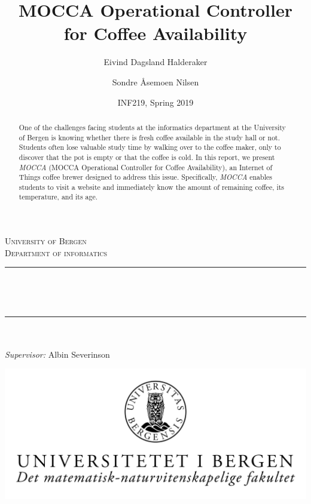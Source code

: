 \documentclass[12pt,a4paper,oneside,article]{memoir}
\title{MOCCA Operational Controller for Coffee Availability}
\author{Eivind Dagsland Halderaker \and Sondre Åsemoen Nilsen}
\date{INF219, Spring 2019}
\numberwithin{equation}{chapter}
\begin{document}
\begin{titlingpage}

\newcommand{\HRule}{\rule{\linewidth}{0.5mm}}
\centering

\textsc{\LARGE University of Bergen \\ Department of informatics}\\[1.5cm] %

\HRule\\[0.5cm]
\begin{Huge}
	\bfseries{\thetitle}\\[0.7cm]
\end{Huge}
\HRule\\[0.5cm]

{\large \theauthor}\\
{\large \emph{Supervisor:} Albin Severinson\\[2cm]}

\centerline{\includegraphics[scale=1.9]{figures/canvasWithFaculty}}
{\large \thedate}\\[3cm]
\vfill

\begin{abstract}
One of the challenges facing students at the informatics department at the 
University of Bergen is knowing whether there is fresh coffee available in the 
study hall or not.  Students often lose valuable study time by walking over to 
the coffee maker, only to discover that the pot is empty or that the coffee is 
cold. In this report, we present \textit{MOCCA} (MOCCA Operational Controller 
for Coffee Availability), an Internet of Things coffee brewer designed to 
address this issue. Specifically, \textit{MOCCA} enables students to visit a 
website and immediately know the amount of remaining coffee, its temperature, 
and its age.
\end{abstract}
\end{titlingpage}

\clearpage
\end{document}
